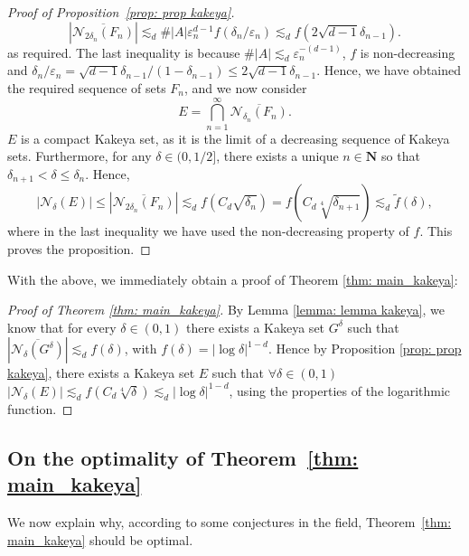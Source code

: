 \documentclass[10pt]{amsart}
\newcommand{\N}{\mathbf{N}}
\begin{document}
\begin{proof}[Proof of Proposition~\ref{prop: prop kakeya}]
\begin{equation*}
    |\overline{\mathcal{N}_{2\delta_n}(F_n)}|\lesssim_d \#|A| \varepsilon_n^{d-1} f(\delta_n/\varepsilon_n) \lesssim_d f(2\sqrt{d-1} \delta_{n-1}).
\end{equation*}
as required. The last inequality is because $\#|A|\lesssim_d \varepsilon_n^{-(d-1)}$, $f$ is non-decreasing and $\delta_n/\varepsilon_n = \sqrt{d-1} \delta_{n-1}/(1-\delta_{n-1}) \leq 2\sqrt{d-1} \delta_{n-1}$. Hence, we have obtained the required sequence of sets $F_n$, and we now consider 
\begin{equation*}
    E=\bigcap_{n=1}^\infty\overline{\mathcal{N}_{\delta_n}(F_n)}.
\end{equation*}
$E$ is a compact Kakeya set, as it is the limit of a decreasing sequence of Kakeya sets. Furthermore, for any $\delta\in (0,1/2]$, there exists a unique $n\in \N$ so that $\delta_{n+1}<\delta\leq \delta_{n}$. Hence, 
\begin{equation*}
    |\mathcal{N}_\delta(E)|\leq |\overline{\mathcal{N}_{2\delta_{n}}(F_{n})}|\lesssim_df(C_d\sqrt{\delta_{n}})=f(C_d\sqrt[4]{\delta_{n+1}})\lesssim_d \widetilde{f}(\delta),
\end{equation*}
where in the last inequality we have used the non-decreasing property of $f$. This proves the proposition.
\end{proof}

With the above, we immediately obtain a proof of Theorem \ref{thm: main_kakeya}:
\begin{proof}[Proof of Theorem \ref{thm: main_kakeya}]
By Lemma \ref{lemma: lemma kakeya}, we know that for every $\delta\in (0,1)$ there exists a Kakeya set $G^\delta$ such that $|\overline{\mathcal{N}_{\delta}(G^\delta)}|\lesssim_d f(\delta)$, with $f(\delta)=|\log\delta|^{1-d}$. Hence by Proposition \ref{prop: prop kakeya}, there exists a Kakeya set $E$ such that $\forall \delta\in (0,1)$ $|\mathcal{N}_\delta(E)|\lesssim_d f(C_d\sqrt[4]{\delta})\lesssim_d |\log\delta|^{1-d}$, using the properties of the logarithmic function.
\end{proof}


\subsection{On the optimality of Theorem~\ref{thm: main_kakeya}}\label{subsection:optimality}

We now explain why, according to some conjectures in the field, Theorem~\ref{thm: main_kakeya} should be optimal.
\end{document}
